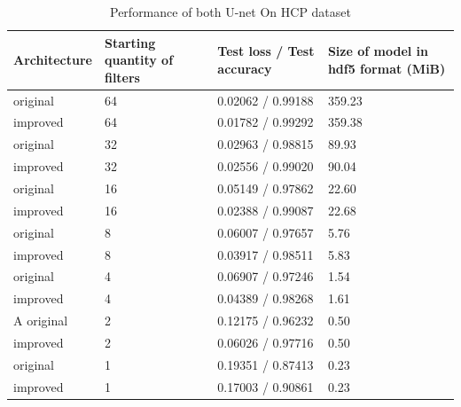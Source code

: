 \documentclass[sigconf]{acmart}
\begin{document}
\begin{table}
 \caption{Performance of both U-net On HCP dataset}
  \centering
  \begin{tabular}{llll}
    \toprule
    Architecture & Starting quantity of filters & Test loss / Test accuracy  & Size of model in hdf5 format (MiB) \\
    \midrule
    original & 64 & 0.02062 / 0.99188 & 359.23     \\
    \midrule
    improved & 64 & 0.01782 / 0.99292 & 359.38     \\
    \midrule
    original & 32 & 0.02963 / 0.98815 & 89.93  \\
    \midrule
    improved & 32 & 0.02556 / 0.99020 & 90.04  \\
    \midrule
    original & 16 & 0.05149 / 0.97862 & 22.60  \\
    \midrule
    improved & 16 & 0.02388 / 0.99087 & 22.68  \\
    \midrule
    original &  8 & 0.06007 / 0.97657 & 5.76  \\
    \midrule
    improved &  8 & 0.03917 / 0.98511 & 5.83  \\
    \midrule
    original &  4 & 0.06907 / 0.97246 & 1.54  \\
    \midrule
    improved &  4 & 0.04389 / 0.98268 & 1.61  \\A
    \midrule
    original &  2 & 0.12175 / 0.96232 & 0.50  \\
    \midrule
    improved &  2 & 0.06026 / 0.97716 & 0.50  \\
    \midrule
    original &  1 & 0.19351 / 0.87413 & 0.23  \\
    \midrule
    improved &  1 & 0.17003 / 0.90861 & 0.23  \\
    \bottomrule
  \end{tabular}
  \label{tab:table1}
\end{table}
\end{document}
